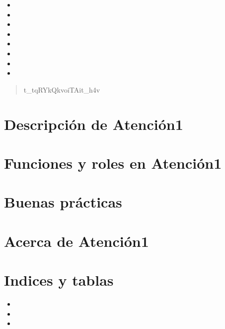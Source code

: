 \documentclass[letterpaper,10pt,spanish]{sphinxmanual}
\begin{document}
\begin{itemize}
\item {} 

\item {} 

\item {} 

\item {} 

\item {} 

\item {} 

\item {} 

\item {} 

\end{itemize}
\begin{quote}

t\_tqRYkQkvoiTAit\_h4v
\end{quote}


\chapter{Descripción de Atención\sphinxhyphen{}1}
\label{\detokenize{descripcion_software:descripcion-de-atencion-1}}\label{\detokenize{descripcion_software::doc}}

\chapter{Funciones y roles en Atención\sphinxhyphen{}1}
\label{\detokenize{roles_funciones:funciones-y-roles-en-atencion-1}}\label{\detokenize{roles_funciones::doc}}

\chapter{Buenas prácticas}
\label{\detokenize{buenas_pr_xe1cticas:buenas-practicas}}\label{\detokenize{buenas_pr_xe1cticas::doc}}

\chapter{Acerca de Atención\sphinxhyphen{}1}
\label{\detokenize{about:acerca-de-atencion-1}}\label{\detokenize{about::doc}}

\chapter{Indices y tablas}
\label{\detokenize{index:indices-y-tablas}}\begin{itemize}
\item {} 

\item {} 

\item {} 

\end{itemize}



\renewcommand{\indexname}{Índice}
\printindex
\end{document}
